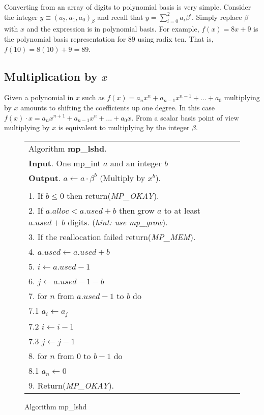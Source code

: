 \documentclass[b5paper]{book}
\begin{document}
Converting from an array of digits to polynomial basis is very simple.  Consider the integer $y \equiv (a_2, a_1, a_0)_{\beta}$ and recall that
$y = \sum_{i=0}^{2} a_i \beta^i$.  Simply replace $\beta$ with $x$ and the expression is in polynomial basis.  For example, $f(x) = 8x + 9$ is the
polynomial basis representation for $89$ using radix ten.  That is, $f(10) = 8(10) + 9 = 89$.  

\subsection{Multiplication by $x$}

Given a polynomial in $x$ such as $f(x) = a_n x^n + a_{n-1} x^{n-1} + ... + a_0$ multiplying by $x$ amounts to shifting the coefficients up one 
degree.  In this case $f(x) \cdot x = a_n x^{n+1} + a_{n-1} x^n + ... + a_0 x$.  From a scalar basis point of view multiplying by $x$ is equivalent to
multiplying by the integer $\beta$.  

\newpage\begin{figure}[!here]
\begin{small}
\begin{center}
\begin{tabular}{l}
\hline Algorithm \textbf{mp\_lshd}. \\
\textbf{Input}.   One mp\_int $a$ and an integer $b$ \\
\textbf{Output}.  $a \leftarrow a \cdot \beta^b$ (Multiply by $x^b$). \\
\hline \\
1.  If $b \le 0$ then return(\textit{MP\_OKAY}). \\
2.  If $a.alloc < a.used + b$ then grow $a$ to at least $a.used + b$ digits.  (\textit{hint: use mp\_grow}). \\
3.  If the reallocation failed return(\textit{MP\_MEM}). \\
4.  $a.used \leftarrow a.used + b$ \\
5.  $i \leftarrow a.used - 1$ \\
6.  $j \leftarrow a.used - 1 - b$ \\
7.  for $n$ from $a.used - 1$ to $b$ do \\
\hspace{3mm}7.1  $a_{i} \leftarrow a_{j}$ \\
\hspace{3mm}7.2  $i \leftarrow i - 1$ \\
\hspace{3mm}7.3  $j \leftarrow j - 1$ \\
8.  for $n$ from 0 to $b - 1$ do \\
\hspace{3mm}8.1  $a_n \leftarrow 0$ \\
9.  Return(\textit{MP\_OKAY}). \\
\hline
\end{tabular}
\end{center}
\end{small}
\caption{Algorithm mp\_lshd}
\end{figure}
\end{document}

